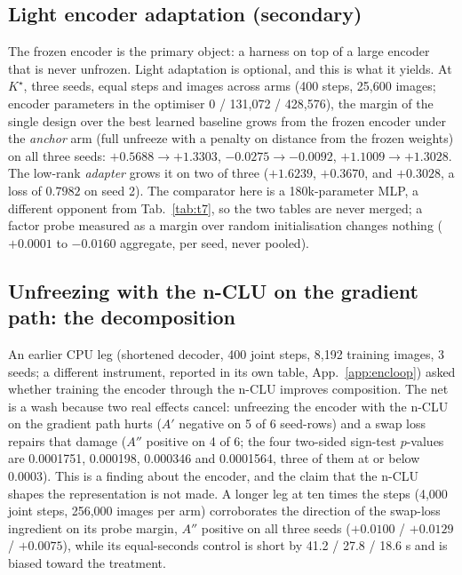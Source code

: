 \documentclass{article} %
\newcommand{\Kstar}{\ensuremath{K^{\star}}}
\begin{document}
\subsection*{Light encoder adaptation (secondary)}

The frozen encoder is the primary object: a harness on top of a large encoder that is never
unfrozen. Light adaptation is optional, and this is what it yields. At $\Kstar$, three seeds,
equal steps and images across arms (400 steps, 25,600 images; encoder parameters in the
optimiser 0 / 131,072 / 428,576), the margin of the single design over the best learned
baseline grows from the frozen encoder under the \emph{anchor} arm (full unfreeze with a
penalty on distance from the frozen weights) on all three seeds: $+0.5688\to+1.3303$,
$-0.0275\to-0.0092$, $+1.1009\to+1.3028$. The low-rank \emph{adapter} grows it on two of
three ($+1.6239$, $+0.3670$, and $+0.3028$, a loss of $0.7982$ on seed 2).
The comparator here is a 180k-parameter MLP, a different opponent from Tab.~\ref{tab:t7}, so
the two tables are never merged; a factor probe measured as a margin over random
initialisation changes nothing ($+0.0001$ to $-0.0160$ aggregate, per seed, never pooled).

\subsection*{Unfreezing with the n-CLU on the gradient path: the decomposition}

An earlier CPU leg (shortened decoder, 400 joint steps, 8,192 training images, 3 seeds; a
different instrument, reported in its own table, App.~\ref{app:encloop}) asked whether
training the encoder through the n-CLU improves composition. The net is a wash because two
real effects cancel: unfreezing the encoder with the n-CLU on the gradient path hurts ($A'$
negative on 5 of 6 seed-rows) and a swap loss repairs that damage ($A''$ positive on 4 of 6;
the four two-sided sign-test $p$-values are 0.0001751, 0.000198, 0.000346 and 0.0001564, three
of them at or below 0.0003). This is a finding about the encoder, and the claim
that the n-CLU shapes the representation is not made. %
A longer leg at ten times the steps (4,000 joint steps, 256,000 images per arm) corroborates
the direction of the swap-loss ingredient on its probe margin, $A''$ positive on all three
seeds ($+0.0100$ / $+0.0129$ / $+0.0075$), while its equal-seconds control is short by 41.2 /
27.8 / 18.6 s and is biased toward the treatment. %
\end{document}
